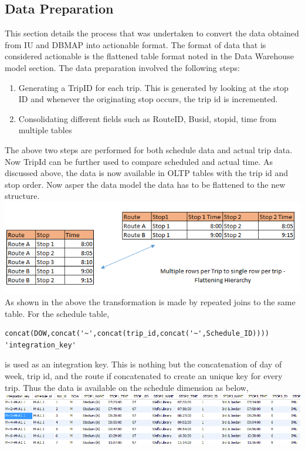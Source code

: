 \documentclass[12pt]{article}
\begin{document}
\subsection{Data Preparation}
This section details the process that was undertaken to convert the data obtained from IU and DBMAP into actionable format. The format of data that is considered actionable is the flattened table format noted in the Data Warehouse model section.
The data preparation involved the following steps:
\begin{enumerate}
\item Generating a TripID for each trip. This is generated by looking at the stop ID and whenever the originating stop occurs, the trip id is incremented.
\item Consolidating different fields such as RouteID, Busid, stopid, time from multiple tables
\end{enumerate}
The above two steps are performed for both schedule data and actual trip data. Now TripId can be further used to compare scheduled and actual time.
As discussed above, the data is now available in OLTP tables with the trip id and stop order. Now asper the data model the data has to be flattened to the new structure.\\
\includegraphics[scale=0.6]{resources/hierarchy}\\[1cm] 
As shown in the above the transformation is made by repeated joins to the same table. For the schedule table,
\begin{verbatim}
concat(DOW,concat('~',concat(trip_id,concat('~',Schedule_ID)))) 'integration_key' 
\end{verbatim}
is used as an integration key. This is nothing but the concatenation of day of week, trip id, and the route if concatenated to create an unique key for every trip. Thus the data is available on the schedule dimension as below,\\
\includegraphics[scale=0.6]{resources/wt1}\\[1cm] 
\end{document}
